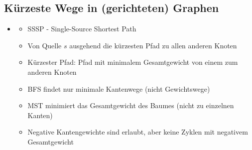 \documentclass[
    ngerman,
    color=3b,
    dark_mode,
    load_common, %
    summary,
    boxarc,
]{tuda_summary}
\begin{document}
\subsection{Kürzeste Wege in (gerichteten) Graphen}
\begin{itemize}
    \item {}
          \begin{itemize}
              \item SSSP - Single-Source Shortest Path
              \item Von Quelle $s$ ausgehend die kürzesten Pfad zu allen anderen Knoten
              \item Kürzester Pfad: Pfad mit minimalem Gesamtgewicht von einem zum anderen Knoten
              \item BFS findet nur minimale Kantenwege (nicht Gewichtswege)
              \item MST minimiert das Gesamtgewicht des Baumes (nicht zu einzelnen Kanten)
              \item Negative Kantengewichte sind erlaubt, aber keine Zyklen mit negativem Gesamtgewicht
          \end{itemize}


\end{itemize}
\end{document}
